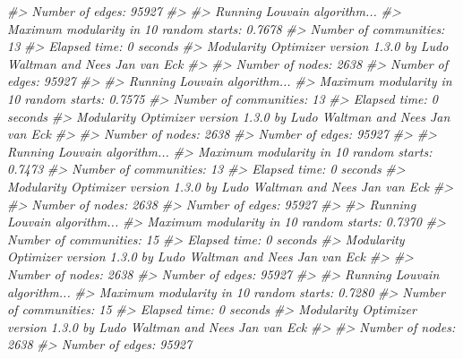 \documentclass[
]{book}
\newenvironment{Shaded}{\begin{snugshade}}{\end{snugshade}}
\newcommand{\CommentTok}[1]{\textcolor[rgb]{0.56,0.35,0.01}{\textit{#1}}}
\begin{document}
\begin{Shaded}
\begin{Highlighting}[]
\CommentTok{\#\textgreater{} Number of edges: 95927}
\CommentTok{\#\textgreater{} }
\CommentTok{\#\textgreater{} Running Louvain algorithm...}
\CommentTok{\#\textgreater{} Maximum modularity in 10 random starts: 0.7678}
\CommentTok{\#\textgreater{} Number of communities: 13}
\CommentTok{\#\textgreater{} Elapsed time: 0 seconds}
\CommentTok{\#\textgreater{} Modularity Optimizer version 1.3.0 by Ludo Waltman and Nees Jan van Eck}
\CommentTok{\#\textgreater{} }
\CommentTok{\#\textgreater{} Number of nodes: 2638}
\CommentTok{\#\textgreater{} Number of edges: 95927}
\CommentTok{\#\textgreater{} }
\CommentTok{\#\textgreater{} Running Louvain algorithm...}
\CommentTok{\#\textgreater{} Maximum modularity in 10 random starts: 0.7575}
\CommentTok{\#\textgreater{} Number of communities: 13}
\CommentTok{\#\textgreater{} Elapsed time: 0 seconds}
\CommentTok{\#\textgreater{} Modularity Optimizer version 1.3.0 by Ludo Waltman and Nees Jan van Eck}
\CommentTok{\#\textgreater{} }
\CommentTok{\#\textgreater{} Number of nodes: 2638}
\CommentTok{\#\textgreater{} Number of edges: 95927}
\CommentTok{\#\textgreater{} }
\CommentTok{\#\textgreater{} Running Louvain algorithm...}
\CommentTok{\#\textgreater{} Maximum modularity in 10 random starts: 0.7473}
\CommentTok{\#\textgreater{} Number of communities: 13}
\CommentTok{\#\textgreater{} Elapsed time: 0 seconds}
\CommentTok{\#\textgreater{} Modularity Optimizer version 1.3.0 by Ludo Waltman and Nees Jan van Eck}
\CommentTok{\#\textgreater{} }
\CommentTok{\#\textgreater{} Number of nodes: 2638}
\CommentTok{\#\textgreater{} Number of edges: 95927}
\CommentTok{\#\textgreater{} }
\CommentTok{\#\textgreater{} Running Louvain algorithm...}
\CommentTok{\#\textgreater{} Maximum modularity in 10 random starts: 0.7370}
\CommentTok{\#\textgreater{} Number of communities: 15}
\CommentTok{\#\textgreater{} Elapsed time: 0 seconds}
\CommentTok{\#\textgreater{} Modularity Optimizer version 1.3.0 by Ludo Waltman and Nees Jan van Eck}
\CommentTok{\#\textgreater{} }
\CommentTok{\#\textgreater{} Number of nodes: 2638}
\CommentTok{\#\textgreater{} Number of edges: 95927}
\CommentTok{\#\textgreater{} }
\CommentTok{\#\textgreater{} Running Louvain algorithm...}
\CommentTok{\#\textgreater{} Maximum modularity in 10 random starts: 0.7280}
\CommentTok{\#\textgreater{} Number of communities: 15}
\CommentTok{\#\textgreater{} Elapsed time: 0 seconds}
\CommentTok{\#\textgreater{} Modularity Optimizer version 1.3.0 by Ludo Waltman and Nees Jan van Eck}
\CommentTok{\#\textgreater{} }
\CommentTok{\#\textgreater{} Number of nodes: 2638}
\CommentTok{\#\textgreater{} Number of edges: 95927}

\end{Highlighting}
\end{Shaded}
\end{document}
